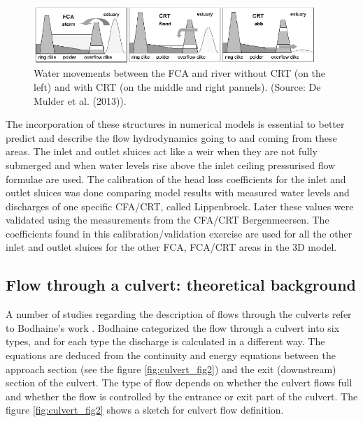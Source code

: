 \begin{figure}[H]
\begin{center}
  \includegraphics[width=0.95\textwidth]{graphics/culvert_fig1.png}
\end{center}
\caption{Water movements between the FCA and river without
CRT (on the left) and with CRT (on the middle and right pannels).
(Source: De Mulder et al. (2013)).}
\label{fig:culvert_fig1}
\end{figure}

The incorporation of these structures in numerical models is essential
to better predict and describe the flow hydrodynamics going to and
coming from these areas. The inlet and outlet sluices act like a weir
when they are not fully submerged and when water levels rise above the
inlet ceiling pressurised flow formulae are used.
The calibration of the head loss coefficients for the inlet and outlet sluices
was done comparing model results with measured water levels and discharges of
one specific CFA/CRT, called Lippenbroek.
Later these values were validated using the measurements from the CFA/CRT Bergenmeersen.
The coefficients found in this calibration/validation exercise are used for all the
other inlet and outlet sluices for the other FCA, FCA/CRT areas in the 3D model.

\subsection{Flow through a culvert: theoretical background}

A number of studies regarding the description of flows through the culverts
refer to Bodhaine's work \cite{Bodhaine1968}.
Bodhaine categorized the flow through a culvert into six types, and for each type
the discharge is calculated in a different way.
The equations are deduced from the continuity and energy equations between the approach
section (see the figure \ref{fig:culvert_fig2}) and the exit (downstream) section of the culvert.
The type of flow depends on whether the culvert flows full and whether the flow is controlled
by the entrance or exit part of the culvert. The figure \ref{fig:culvert_fig2}
shows a sketch for culvert flow definition.

